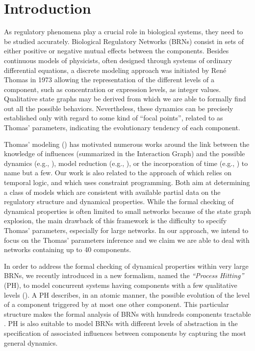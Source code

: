 \section{Introduction}
As regulatory phenomena play a crucial role in biological systems, they need to be studied accurately.
Biological Regulatory Networks (BRNs) consist in sets of either positive or negative mutual effects between the components.
Besides continuous models of physicists, often designed through systems of ordinary
differential equations, a discrete modeling approach was initiated by René Thomas in 1973
\cite{Thomas73} allowing the representation of the different levels of a component, such as concentration or expression levels, as integer values.
Qualitative state graphs may be derived from which we are able to formally find out all the possible behaviors.
Nevertheless, these dynamics can be precisely established only with regard to some kind of ``focal points'', related to as Thomas' parameters, indicating the evolutionary tendency of each component.

Thomas' modeling () has motivated numerous works around the link between the knowledge of influences
(summarized in the Interaction Graph) and the possible dynamics (e.g., \cite{RiCo07}), %
model reduction (e.g., \cite{Naldi09}), %
or the incorporation of time (e.g., \cite{Siebert06}) %
to name but a few.
Our work is also related to the approach of \cite{Khalis09} which relies on temporal logic, and \cite{20646302,DBLP:conf/ipcat/CorblinFTCT12} which uses constraint programming. Both aim at determining a class of models which are consistent with available partial data on the regulatory structure and dynamical properties.
While the formal checking of dynamical properties is often limited to small networks because of the
state graph explosion, the main drawback of this framework is the difficulty to specify Thomas'
parameters, especially for large networks.
In our approach, we intend to focus on the Thomas' parameters inference and we claim we are able to deal with networks containing up to 40 components.

In order to address the formal checking of dynamical properties within very large BRNs, we recently
introduced in \cite{PMR10-TCSB} a new formalism, named the \emph{``Process Hitting''} (PH), to model
concurrent systems having components with a few qualitative levels ().
A PH describes, in an atomic manner, the possible evolution of the level of a component
triggered by at most one other component.
This particular structure makes the formal analysis of BRNs with hundreds components tractable \cite{PMR12-MSCS}.
PH is also suitable to model BRNs with different levels of abstraction in the specification of
associated influences between components by capturing the most general dynamics.

